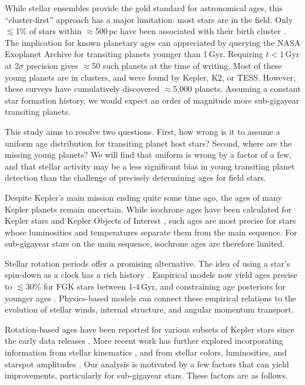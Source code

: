 \documentclass[11pt,twocolumn,tighten,linenumbers,trackchanges]{aastex63}
\begin{document}
While stellar ensembles provide the gold standard for astronomical ages,
this ``cluster-first'' approach has a major limitation: most 
stars are in the field.  Only $\lesssim$1\% of stars within
$\approx$500\,pc have been associated with their birth cluster
\citep[e.g.][]{Zari_2018,CantatGaudin_2020,Kounkel_2020,Kerr_2021}.
The implication for known planetary ages can appreciated by querying the NASA Exoplanet Archive
\citep[NEA;][]{2013PASP..125..989A} for transiting planets younger
than 1\,Gyr.  Requiring $t$$<$1\,Gyr at 2$\sigma$ precision gives
$\approx$50 such planets at the time of writing.  Most of these young
planets are in clusters, and were found by Kepler, K2, or TESS.
However, these surveys have cumulatively discovered $\approx$5{,}000 planets.
Assuming a constant star formation history, we would expect an
order of magnitude more sub-gigayear transiting planets.

This study aims to resolve two questions.  First, how wrong is it to
assume a uniform age distribution for transiting planet host stars?
Second, where are the missing young planets?  We will find that
uniform is wrong by a factor of a few, and that stellar activity may
be a less significant bias in young transiting planet detection than
the challenge of precisely determining ages for field stars.

Despite Kepler's main mission ending quite some time ago, the ages of
many Kepler planets remain uncertain.  While isochrone ages have been
calculated for Kepler stars \citep{Berger_2020b_rpage} and Kepler
Objects of Interest \citep[KOIs;][]{Petigura_2022}, such ages are most
precise for stars whose luminosities and temperatures separate them
from the main sequence.  For sub-gigayear stars on the main sequence,
isochrone ages are therefore limited.

Stellar rotation periods offer a promising alternative.  The idea of
using a star's spin-down as a clock has a rich history
\citep{Skumanich_1972,Noyes_1984,Kawaler_1989,Barnes03,Mamajek_2008,Angus_2015}.
Empirical models now yield ages precise to $\lesssim$30\% for FGK
stars between 1-4\,Gyr, and constraining age posteriors for younger
ages \citep{Bouma_2023}.  Physics-based models
\citep{Matt_2015,Gallet_Bouvier_2015,Spada_2020} can connect these
empirical relations to the evolution of stellar winds, internal
structure, and angular momentum transport.

Rotation-based ages have been reported for various subsets of Kepler
stars since the early data releases
\citep[e.g.][]{Walkowicz_2013,McQuillan_2014,Reinhold_2015,Angus_2018}.
More recent work has further explored incorporating information from
stellar kinematics \citep{2021AJ....161..189L,2024AJ....167..159L},
and from stellar colors, luminosities, and starspot amplitudes
\citep{2023ApJ...952..131M}.  Our analysis is motivated by a few
factors that can yield improvements, particularly for sub-gigayear
stars.   These factors are as follows.
\end{document}
